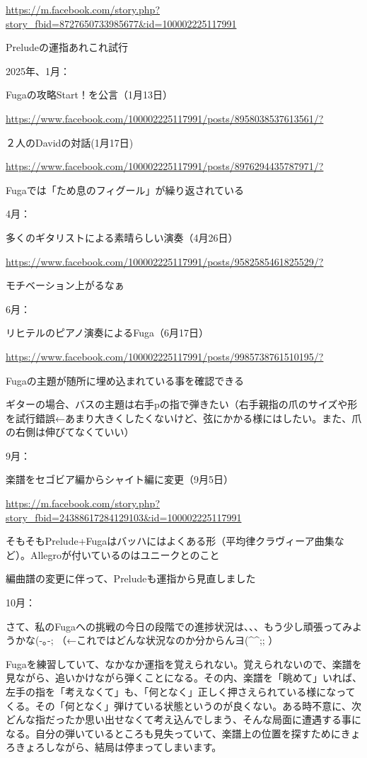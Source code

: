 \url{https://m.facebook.com/story.php?story_fbid=8727650733985677&id=100002225117991}

Preludeの運指あれこれ試行

2025年、1月：

Fugaの攻略Start！を公言（1月13日）

\url{https://www.facebook.com/100002225117991/posts/8958038537613561/?}

２人のDavidの対話(1月17日)

\url{https://www.facebook.com/100002225117991/posts/8976294435787971/?}

Fugaでは「ため息のフィグール」が繰り返されている

4月：

多くのギタリストによる素晴らしい演奏（4月26日）

\url{https://www.facebook.com/100002225117991/posts/9582585461825529/?}

モチベーション上がるなぁ

6月：

リヒテルのピアノ演奏によるFuga（6月17日）

\url{https://www.facebook.com/100002225117991/posts/9985738761510195/?}

Fugaの主題が随所に埋め込まれている事を確認できる

ギターの場合、バスの主題は右手pの指で弾きたい（右手親指の爪のサイズや形を試行錯誤←あまり大きくしたくないけど、弦にかかる様にはしたい。また、爪の右側は伸びてなくていい）

9月：

楽譜をセゴビア編からシャイト編に変更（9月5日）

\url{https://m.facebook.com/story.php?story_fbid=24388617284129103&id=100002225117991}

そもそもPrelude+Fugaはバッハにはよくある形（平均律クラヴィーア曲集など）。Allegroが付いているのはユニークとのこと

編曲譜の変更に伴って、Preludeも運指から見直しました

10月：

さて、私のFugaへの挑戦の今日の段階での進捗状況は、、、もう少し頑張ってみようかな(-｡-; （←これではどんな状況なのか分からんヨ(\textasciicircum{}\textasciicircum{};; ）

Fugaを練習していて、なかなか運指を覚えられない。覚えられないので、楽譜を見ながら、追いかけながら弾くことになる。その内、楽譜を「眺めて」いれば、左手の指を「考えなくて」も、「何となく」正しく押さえられている様になってくる。その「何となく」弾けている状態というのが良くない。ある時不意に、次どんな指だったか思い出せなくて考え込んでしまう、そんな局面に遭遇する事になる。自分の弾いているところも見失っていて、楽譜上の位置を探すためにきょろきょろしながら、結局は停まってしまいます。

